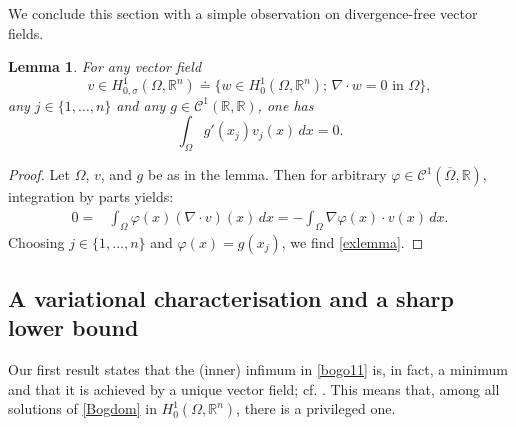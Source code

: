 \documentclass[11pt]{article}
\theoremstyle{plain}
\newtheorem{lemma}[theorem]{Lemma}
\theoremstyle{definition}
\numberwithin{equation}{section}
\newcommand{\R}{\mathbb{R}}
\begin{document}
We conclude this section with a simple observation on divergence-free vector fields.

\begin{lemma}\label{lem:lemma1}
For any vector field
\begin{equation}\label{H10s}
v \in H^{1}_{0,\sigma}(\Omega,\R^n)\doteq\{w\in H^1_0(\Omega,\R^n);\, \nabla \cdot w=0\mbox{ in }\Omega\},
\end{equation}
any $j\in\{1,\ldots,n\}$ and any $g\in\mathcal{C}^1(\R,\R)$, one has
\begin{equation} \label{exlemma}
\int_\Omega g'(x_j )v_j(x)\, dx=0.
\end{equation}	
\end{lemma}
\noindent
\begin{proof}
Let $\Omega$, $v$, and $g$ be as in the lemma. Then for  	
arbitrary $\varphi\in \mathcal{C}^1(\overline{\Omega}, \mathbb{R})$,  integration by parts yields:
\begin{align*}
0=& \int_\Omega \varphi (x) (\nabla \cdot v) (x) \, dx= -\int_\Omega \nabla\varphi(x) \cdot v(x)\, dx.
\end{align*}
Choosing $j\in\{1,\ldots,n\}$ and $\varphi(x)= g(x_j)$, we find \eqref{exlemma}.\end{proof}



\subsection{A variational characterisation and a sharp lower bound}

Our first result states that the (inner) infimum in \eqref{bogo11} is, in fact, a minimum and that it is achieved by a unique vector field; cf.
\cite{costabel2017inequalities,costabel,horgan,ladyzhenskaya1978some,velte1998inequalities,zsuppan2020}. This means that, among all solutions of \eqref{Bogdom} in
$H^1_0 (\Omega, \mathbb{R}^{n})$, there is a privileged one.
\end{document}

